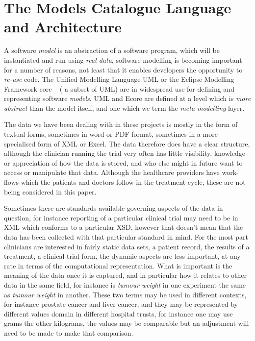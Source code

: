 \section{The Models Catalogue Language and Architecture}
 


A software \emph{model} is an abstraction of a software program, which will be instantiated and run using \emph{real data}, software modelling is becoming important for a number of reasons, not least that it enables developers the opportunity to \emph{re-use} code. The Unified Modelling Language UML \cite{UML} or the Eclipse Modelling Framework core ~\cite{ECORE} ( a subset of UML) are in widespread use for defining and representing software \emph{models}. UML and Ecore are defined at a level which is \emph{more abstract} than the model itself, and one which we term the \emph{meta-modelling} layer. 

The data we have been dealing with in these projects is mostly in the form of textual forms, sometimes in word or PDF format, sometimes in a more specialised form of XML or Excel. The data therefore does have a clear structure, although the clinician running the trial very often has little visibility, knowledge or appreciation of how the data is stored, and who else might in future want to access or manipulate that data.  Although the healthcare providers have work-flows which the patients and doctors follow in the treatment cycle, these are not being considered in this paper.

Sometimes there are standards available governing aspects of the data in question, for instance reporting of a particular clinical trial may need to be in XML which conforms to a particular XSD, however that doesn't mean that the data has been collected with that particular standard in mind.  For the most part clinicians are interested in fairly static data sets, a patient record, the results of a treatment, a clinical trial form, the dynamic aspects are less important, at any rate in terms of the computational representation. What is important is the meaning of the data once it is captured, and in particular how it relates to other data in the same field, for instance is \emph{tumour weight} in one experiment the same as \emph{tumour weight} in another. These two terms may be used in different contexts, for instance prostate cancer and liver cancer, and they may be represented by different values domain in different hospital trusts, for instance one may use grams the other kilograms, the values may be comparable but an adjustment will need to be made to make that comparison.

